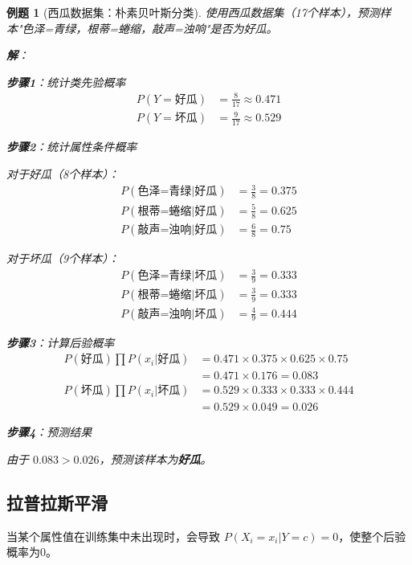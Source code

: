 \documentclass[12pt,a4paper]{ctexart}
\newtheorem{exercise}{例题}[section]
\begin{document}
\begin{exercise}[西瓜数据集：朴素贝叶斯分类]
使用西瓜数据集（17个样本），预测样本"色泽=青绿，根蒂=蜷缩，敲声=浊响"是否为好瓜。

\textbf{解}：

\textbf{步骤1}：统计类先验概率
\begin{align*}
P(Y=\text{好瓜}) &= \frac{8}{17} \approx 0.471 \\
P(Y=\text{坏瓜}) &= \frac{9}{17} \approx 0.529
\end{align*}

\textbf{步骤2}：统计属性条件概率

对于好瓜（8个样本）：
\begin{align*}
P(\text{色泽=青绿} | \text{好瓜}) &= \frac{3}{8} = 0.375 \\
P(\text{根蒂=蜷缩} | \text{好瓜}) &= \frac{5}{8} = 0.625 \\
P(\text{敲声=浊响} | \text{好瓜}) &= \frac{6}{8} = 0.75
\end{align*}

对于坏瓜（9个样本）：
\begin{align*}
P(\text{色泽=青绿} | \text{坏瓜}) &= \frac{3}{9} = 0.333 \\
P(\text{根蒂=蜷缩} | \text{坏瓜}) &= \frac{3}{9} = 0.333 \\
P(\text{敲声=浊响} | \text{坏瓜}) &= \frac{4}{9} = 0.444
\end{align*}

\textbf{步骤3}：计算后验概率
\begin{align*}
P(\text{好瓜}) \prod P(x_i | \text{好瓜}) &= 0.471 \times 0.375 \times 0.625 \times 0.75 \\
&= 0.471 \times 0.176 = 0.083 \\
P(\text{坏瓜}) \prod P(x_i | \text{坏瓜}) &= 0.529 \times 0.333 \times 0.333 \times 0.444 \\
&= 0.529 \times 0.049 = 0.026
\end{align*}

\textbf{步骤4}：预测结果

由于 $0.083 > 0.026$，预测该样本为\textbf{好瓜}。
\end{exercise}

\subsection{拉普拉斯平滑}

\begin{notebox}[零概率问题]
当某个属性值在训练集中未出现时，会导致 $P(X_i=x_i | Y=c) = 0$，使整个后验概率为0。
\end{notebox}
\end{document}
